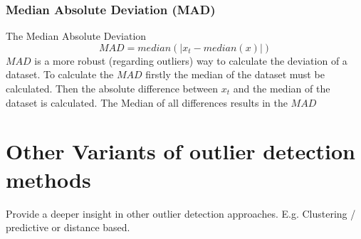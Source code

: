 \subsubsection{Median Absolute Deviation (\ac{MAD})}
The Median Absolute Deviation 
$$
MAD = median(|x_t - median(x)|)
$$
$MAD$ is a more robust (regarding outliers) way to calculate the deviation of a dataset. To calculate the $MAD$ firstly the median of the dataset must be calculated. Then the absolute difference between $x_t$ and the median of the dataset is calculated. The Median of all differences results in the $MAD$
\cite{leysDetectingOutliersNot2013, mehrangOutlierDetectionWeight2015}


\section{Other Variants of outlier detection methods}
Provide a deeper insight in other outlier detection approaches. E.g. Clustering / predictive or distance based.
